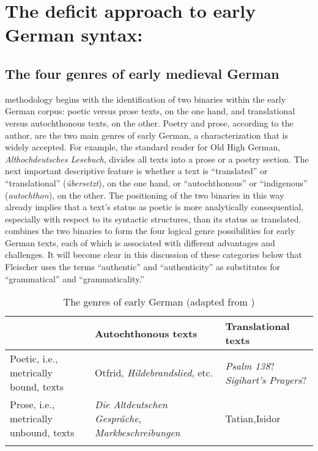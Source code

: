 \section{The deficit approach to early German syntax: \citet{Fleischer2006}}\label{sec:2.1}

\subsection{The four genres of early medieval German}\label{sec:2.1.1}\largerpage

 methodology begins with the identification of two binaries within the early German corpus: poetic versus prose texts, on the one hand, and translational versus autochthonous texts, on the other. Poetry and prose, according to the author, are the two main genres of early German, a characterization that is widely accepted. For example, the standard reader for Old High German,  \textit{Althochdeutsches Lesebuch}, divides all texts into a prose or a poetry section. The next important descriptive feature is whether a text is “translated” or “translational” (\textit{übersetzt}), on the one hand, or “autochthonous” or “indigenous” (\textit{autochthon}), on the other. The positioning of the two binaries in this way already implies that a text’s status as poetic is more analytically consequential, especially with respect to its syntactic structures, than its status as translated. \citet[30]{Fleischer2006} combines the two binaries to form the four logical genre possibilities for early German texts, each of which is associated with different advantages and challenges. It will become clear in this discussion of these categories below that Fleischer uses the terms “authentic” and “authenticity” as substitutes for “grammatical” and “grammaticality.”

\begin{table}
\caption{The genres of early German (adapted from )}
\label{tab:2:2.1}
\begin{tabularx}{\textwidth}{Qp{4.5cm}Q}
\lsptoprule
~ & Autochthonous texts & Translational texts\\
\midrule
Poetic, i.e., metrically bound, texts & Otfrid, \textit{Hildebrandslied}, etc. & \textit{Psalm 138}?\newline \textit{Sigihart's Prayers}?\\
\tablevspace
Prose, i.e., metrically unbound, texts & \textit{Die Altdeutschen Gespräche}, \textit{Markbeschreibungen} & Tatian,\newline Isidor\\
\lspbottomrule
\end{tabularx}
\end{table}


